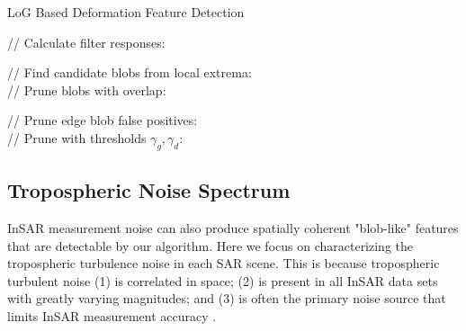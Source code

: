 \documentclass{utexasthesis}
\begin{document}
\begin{algorithm} [htb]
\caption{LoG Based Deformation Feature Detection}\label{algo:blobs}
\SetAlgoLined
{}


// Calculate filter responses:\\

// Find candidate blobs from local extrema:\\
\For{$ (i, j, m) \in  L $}{
	\If{$L[i, j, m] $ is local extremum }{
		Compute $ r = \sqrt{2}\sigma_m $ \\
		Add $ (i, j, r) $ to list of candidate detections
	}
}
// Prune blobs with overlap:\\

// Prune edge blob false positives:\\
// Prune with thresholds $ \gamma_g, \gamma_d $:\\
\end{algorithm}



\subsection{Tropospheric Noise Spectrum}
\label{subsec:methods-2-tropo-spectrum}
 InSAR measurement noise can also produce spatially coherent "blob-like" features that are detectable by our algorithm.  Here we focus on characterizing the tropospheric turbulence noise in each SAR scene. This is because tropospheric turbulent noise (1) is correlated in space; (2) is present in all InSAR data sets with greatly varying magnitudes; and (3) is often the primary noise source that limits InSAR measurement accuracy \cite{Bekaert2015StatisticalComparisonInsar}.
\end{document}
